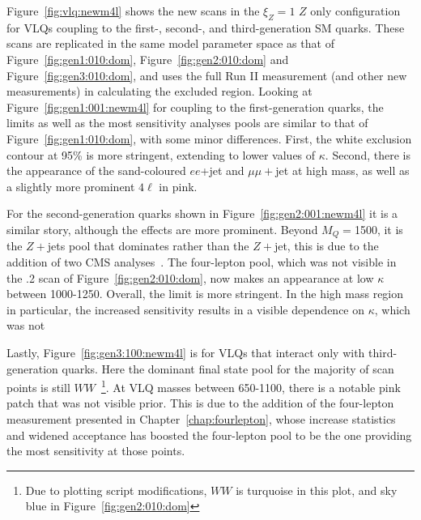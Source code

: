 Figure~\ref{fig:vlq:newm4l} shows the new \contur scans in the $\xi_Z=1$ $Z$ only configuration for VLQs coupling to the first-, second-, and third-generation SM quarks. These scans are replicated in the same model parameter space as that of Figure~\ref{fig:gen1:010:dom}, Figure~\ref{fig:gen2:010:dom} and Figure~\ref{fig:gen3:010:dom}, and uses the \ATLAS full Run II \mFourL{} measurement (and other new measurements) in calculating the excluded region. Looking at Figure~\ref{fig:gen1:001:newm4l} for coupling to the first-generation quarks, the limits as well as the most sensitivity analyses pools are similar to that of Figure~\ref{fig:gen1:010:dom}, with some minor differences. First, the white exclusion contour at 95\% is more stringent, extending to lower values of $\kappa$. Second, there is the appearance of the sand-coloured \CMS $ee$+jet and \CMS $\mu\mu+$jet at high mass, as well as a slightly more prominent \ATLAS $4\ell$ in pink. 

For the second-generation quarks shown in Figure~\ref{fig:gen2:001:newm4l} it is a similar story, although the effects are more prominent. Beyond $M_Q=$\unit{1500}{\GeV}, it is the \CMS $Z+$jets pool that dominates rather than the \ATLAS $Z+$jet, this is due to the addition of two CMS analyses~\cite{Sirunyan:2019bzr,Sirunyan:2018cpw}. The four-lepton pool, which was not visible in the .2 scan of Figure~\ref{fig:gen2:010:dom}, now makes an appearance at low $\kappa$ between \unit{1000}{\GeV}-\unit{1250}{\GeV}. Overall, the \contur limit is more stringent. In the high mass region in particular, the increased sensitivity results in a visible dependence on $\kappa$, which was not 

Lastly, Figure~\ref{fig:gen3:100:newm4l} is for VLQs that interact only with third-generation quarks. Here the dominant final state pool for the majority of scan points is still \ATLAS $WW$~\footnote{Due to plotting script modifications, \ATLAS $WW$ is turquoise in this plot, and sky blue in Figure~\ref{fig:gen2:010:dom}}. At VLQ masses between \unit{650}{\GeV}-\unit{1100}{\GeV}, there is a notable pink patch that was not visible prior. This is due to the addition of the four-lepton measurement presented in Chapter~\ref{chap:fourlepton}, whose increase statistics and widened acceptance has boosted the four-lepton pool to be the one providing the most sensitivity at those points. 

